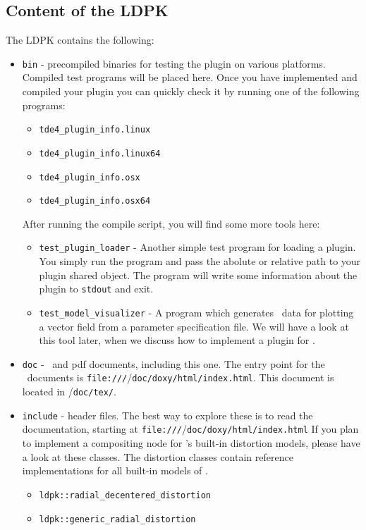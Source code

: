 \documentclass[10pt,a4paper]{article}
\begin{document}
\subsection{Content of the LDPK}
The LDPK contains the following:
\begin{itemize}
\item {\tt bin} - precompiled binaries for testing the plugin on various platforms.
Compiled test programs will be placed here.
Once you have implemented and compiled your plugin you can quickly check it by
running one of the following programs:
	\begin{itemize}
	\item {\tt tde4\_plugin\_info.linux}
	\item {\tt tde4\_plugin\_info.linux64}
	\item {\tt tde4\_plugin\_info.osx}
	\item {\tt tde4\_plugin\_info.osx64}
	\end{itemize}
After running the compile script, you will find some more tools here:
	\begin{itemize}
	\item {\tt test\_plugin\_loader} - Another simple test program for loading a plugin.
	You simply run the program and pass the abolute or relative
	path to your plugin shared object. The program will write
	some information about the plugin to {\tt stdout} and exit.
	\item {\tt test\_model\_visualizer} - A program which generates \gnuplot\
	data for plotting a vector field from a parameter specification file.
	We will have a look at this tool later, when we discuss how to implement
	a plugin for \tde.
	\end{itemize}	
\item {\tt doc} - \doxygen\ and pdf documents, including this one.
The entry point for the \doxygen\ documents is {\tt file:///}\ldpk/{\tt doc/doxy/html/index.html}.
This document is located in \ldpk/{\tt doc/tex/}.
\item {\tt include} - header files. The best way to explore these is to read the \doxygen
documentation, starting at {\tt file:///}\ldpk/{\tt doc/doxy/html/index.html}
If you plan to implement a compositing node for \tde's built-in distortion models,
please have a look at these classes. The distortion classes contain reference implementations
for all built-in models of \tde.
\begin{itemize}
\item {\tt ldpk::radial\_decentered\_distortion}
\item {\tt ldpk::generic\_radial\_distortion}

\end{itemize}
\end{itemize}
\end{document}
